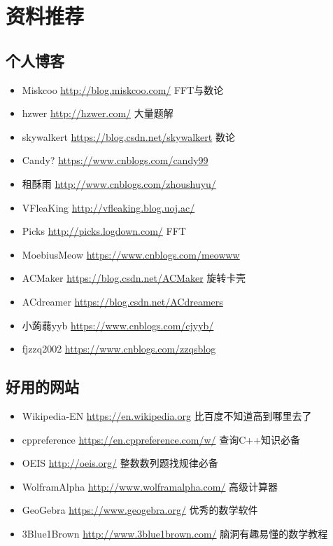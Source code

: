 \chapter{资料推荐}
\section{个人博客}
\begin{itemize}
	\item Miskcoo \url{http://blog.miskcoo.com/} FFT与数论
	\item hzwer \url{http://hzwer.com/} 大量题解
    \item skywalkert \url{https://blog.csdn.net/skywalkert} 数论
    \item Candy? \url{https://www.cnblogs.com/candy99}
    \item 租酥雨 \url{http://www.cnblogs.com/zhoushuyu/}
    \item VFleaKing \url{http://vfleaking.blog.uoj.ac/}
    \item Picks \url{http://picks.logdown.com/} FFT
    \item MoebiusMeow \url{https://www.cnblogs.com/meowww}
    \item ACMaker \url{https://blog.csdn.net/ACMaker} 旋转卡壳
    \item ACdreamer \url{https://blog.csdn.net/ACdreamers}
    \item 小蒟蒻yyb \url{https://www.cnblogs.com/cjyyb/}
    \item fjzzq2002 \url{https://www.cnblogs.com/zzqsblog}
\end{itemize}
\section{好用的网站}
\begin{itemize}
    \item Wikipedia-EN \url{https://en.wikipedia.org} 比百度不知道高到哪里去了
    \item cppreference \url{https://en.cppreference.com/w/} 查询C++知识必备
    \item OEIS \url{http://oeis.org/} 整数数列题找规律必备
    \item WolframAlpha \url{http://www.wolframalpha.com/} 高级计算器
    \item GeoGebra \url{https://www.geogebra.org/} 优秀的数学软件
    \item 3Blue1Brown \url{http://www.3blue1brown.com/} 脑洞有趣易懂的数学教程
\end{itemize}
